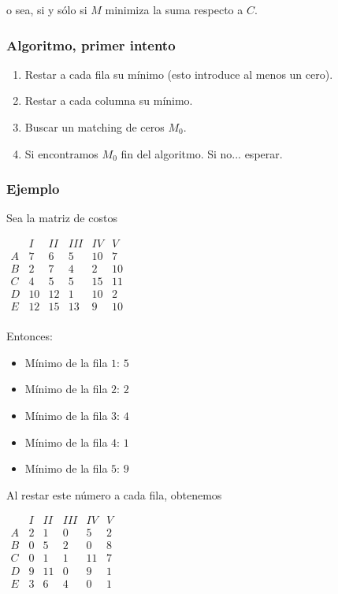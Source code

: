 \documentclass[10pt,a4paper]{article}
\begin{document}
o sea, si y sólo si $M$ minimiza la suma respecto a $C$.

\subsubsection*{Algoritmo, primer intento}

\begin{enumerate}

	\item Restar a cada fila su mínimo (esto introduce al menos un cero).
	\item Restar a cada columna su mínimo.
	\item Buscar un matching de ceros $M_0$.
	\item Si encontramos $M_0$ fin del algoritmo. Si no... esperar.
\end{enumerate}

\subsubsection*{Ejemplo}

Sea la matriz de costos

\begin{center}
$\begin{array}{c|ccccc} &I&II&III&IV&V\\ \hline A&7&6&5&10&7\\ B&2&7&4&2&10\\ C&4&5&5&15&11\\ D&10&12&1&10&2\\ E&12&15&13&9&10\\ \end{array}$
\end{center}

Entonces:

\begin{itemize}

	\item Mínimo de la fila $1$: $5 $
	\item Mínimo de la fila $2$: $2$
	\item Mínimo de la fila $3$: $4$
	\item Mínimo de la fila $4 $: $1 $
	\item Mínimo de la fila $5$: $9$
\end{itemize}

Al restar este número a cada fila, obtenemos

\begin{center}
$\begin{array}{c|ccccc} &I&II&III&IV&V\\ \hline A&2&1&0&5&2\\ B&0&5&2&0&8\\ C&0&1&1&11&7\\ D&9&11&0&9&1\\ E&3&6&4&0&1\\ \end{array}$
\end{center}
\end{document}
